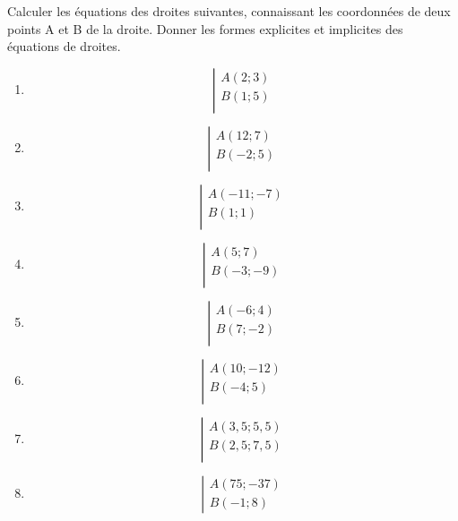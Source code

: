 \begin{exercice}
Calculer les équations des droites suivantes, connaissant les coordonnées de deux points A et B de la droite. Donner les formes explicites et implicites des équations de droites.
\begin{multicols}{2}
\begin{enumerate}
\item $$ \left| \begin{array}{l}
 A(2;3) \\ 
B\left( 1;5 \right) \\ 
\end{array} \right.$$
\item $$\left| \begin{array}{l}
 A(12;7) \\ 
B\left( -2;5 \right) \\ 
\end{array} \right.$$
\item $$\left| \begin{array}{l}
 A(-11;-7) \\ 
B\left( 1;1 \right) \\ 
\end{array} \right.$$
\item $$\left| \begin{array}{l}
 A(5;7) \\ 
B\left( -3;-9 \right) \\ 
\end{array} \right.$$
\item $$\left| \begin{array}{l}
 A(-6;4) \\ 
B\left( 7;-2 \right) \\ 
\end{array} \right.$$
\item $$\left| \begin{array}{l}
 A(10;-12) \\ 
B\left( -4;5 \right) \\ 
\end{array} \right.$$
\item $$\left| \begin{array}{l}
 A(3,5;5,5) \\ 
B\left( 2,5;7,5 \right) \\ 
\end{array} \right.$$
\item $$\left| \begin{array}{l}
 A(75;-37) \\ 
B\left( -1;8 \right) 
 \end{array} \right.$$

\end{enumerate}
\end{multicols}
\end{exercice}
